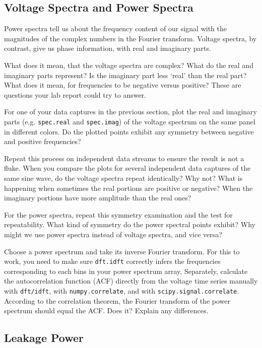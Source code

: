 \documentclass[11pt,preprint]{aastex}
\begin{document}
\subsection{Voltage Spectra and Power Spectra}

\noindent
Power spectra tell us about the frequency content of our signal with
the magnitudes of the complex numbers in the Fourier transform.  Voltage
spectra, by contrast, give us phase information,
with real and imaginary parts.

What does it mean, that the voltage spectra are complex? What do the real
and imaginary parts represent? Is the imaginary part less `real'
than the real part?
What does it mean, for frequencies to be negative versus
positive? These are questions your lab report could try to answer.

For one of your data captures in the previous section, plot the real and imaginary parts
(e.g. {\tt spec.real} and {\tt spec.imag})
of the voltage spectrum on the same panel in different colors.
Do the plotted points 
exhibit any symmetry between negative and positive
frequencies?

Repeat this process on independent data
streams to ensure the result is not a fluke.
When you compare the plots for several independent data captures of the same sine wave, do the
voltage spectra repeat identically?  Why not? What is happening when
sometimes the real portions are positive or negative? When the imaginary
portions have more amplitude than the real ones?

For the power spectra, repeat this symmetry examination and the test for
repeatability. What kind of symmetry do the power spectral points
exhibit? Why might we use power spectra instead of voltage spectra, and vice versa?

Choose a power spectrum and take its inverse Fourier transform.
For this to work, you need to make sure {\tt dft.idft} correctly infers
the frequencies corresponding to each bins in your power spectrum array,
Separately, calculate the autocorrelation function (ACF) directly from 
the voltage time series manually with {\tt dft/idft}, with \verb$numpy.correlate$, and with \verb$scipy.signal.correlate$.
According to the correlation theorem, the Fourier transform
of the power spectrum should equal the ACF. Does it? Explain any differences.

\subsection{Leakage Power} \label{subleakage}
\end{document}
